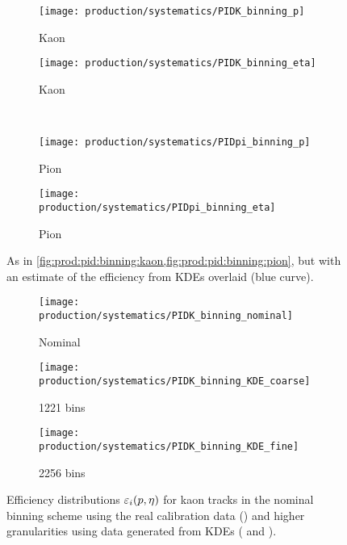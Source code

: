 \begin{figure}
  \begin{subfigure}{0.5\textwidth}
    \centering
    \texttt{[image: production/systematics/PIDK\_binning\_p]}
    \caption{Kaon \ptot}
    \label{fig:prod:syst:pid:kde_1d_binning:kaon_p}
  \end{subfigure}
  \begin{subfigure}{0.5\textwidth}
    \centering
    \texttt{[image: production/systematics/PIDK\_binning\_eta]}
    \caption{Kaon \Eta}
    \label{fig:prod:syst:pid:kde_1d_binning:kaon_eta}
  \end{subfigure}
  \\[0.5cm]
  \begin{subfigure}{0.5\textwidth}
    \centering
    \texttt{[image: production/systematics/PIDpi\_binning\_p]}
    \caption{Pion \ptot}
    \label{fig:prod:syst:pid:kde_1d_binning:pion_p}
  \end{subfigure}
  \begin{subfigure}{0.5\textwidth}
    \centering
    \texttt{[image: production/systematics/PIDpi\_binning\_eta]}
    \caption{Pion \Eta}
    \label{fig:prod:syst:pid:kde_1d_binning:pion_eta}
  \end{subfigure}

  \caption{%
    As in \cref{fig:prod:pid:binning:kaon,fig:prod:pid:binning:pion}, but with 
    an estimate of the efficiency from \aclp{KDE} overlaid (blue curve).
  }
  \label{fig:prod:syst:pid:kde_1d_binning}
\end{figure}

\begin{figure}
  \begin{subfigure}{0.32\textwidth}
    \centering
    \texttt{[image: production/systematics/PIDK\_binning\_nominal]}
    \caption{Nominal}
    \label{fig:prod:syst:pid:kde_2d_binning:kaon:nominal}
  \end{subfigure}
  \begin{subfigure}{0.32\textwidth}
    \centering
    \texttt{[image: production/systematics/PIDK\_binning\_KDE\_coarse]}
    \caption{1221 bins}
    \label{fig:prod:syst:pid:kde_2d_binning:kaon:coarse}
  \end{subfigure}
  \begin{subfigure}{0.32\textwidth}
    \centering
    \texttt{[image: production/systematics/PIDK\_binning\_KDE\_fine]}
    \caption{2256 bins}
    \label{fig:prod:syst:pid:kde_2d_binning:kaon:fine}
  \end{subfigure}

  \caption{%
    Efficiency distributions $\varepsilon_{i}(p,\eta)$ for kaon tracks in the 
    nominal binning scheme using the real calibration data 
    () and higher 
    granularities using data generated from \aclp{KDE} 
    ( and 
    ).
  }
  \label{fig:prod:syst:pid:kde_2d_binning:kaon}
\end{figure}

